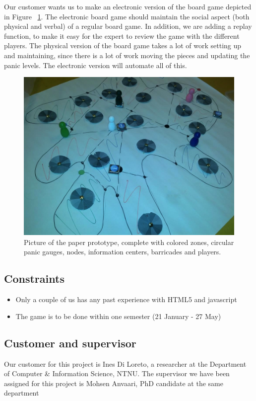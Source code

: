 Our customer wants us to make an electronic version of the board game depicted in Figure ~\ref{fig:paperPrototype}. The electronic board game should maintain the social aspect (both physical and verbal) of a regular board game. In addition, we are adding a replay function, to make it easy for the expert to review the game with the different players. The physical version of the board game takes a lot of work setting up and maintaining, since there is a lot of work moving the pieces and updating the panic levels. The electronic version will automate all of this.

\begin{figure}[here]
  \centering
    \includegraphics[width=1.0\textwidth]{img/paper_prototype}
  \caption{Picture of the paper prototype, complete with colored zones, circular panic gauges, nodes, information centers, barricades and players.} \label{fig:paperPrototype}
\end{figure}

\subsection{Constraints}
\begin{itemize} \setlength{\itemsep}{0cm}\setlength{\parskip}{0cm}%
	\item Only a couple of us has any past experience with HTML5 and javascript
\item The game is to be done within one semester (21 January - 27 May)
\end{itemize}

\subsection{Customer and supervisor}

Our customer for this project is Ines Di Loreto, a researcher at the Department of Computer \& Information Science, NTNU. The supervisor we have been assigned for this project is Mohsen Anvaari, PhD candidate at the same department






